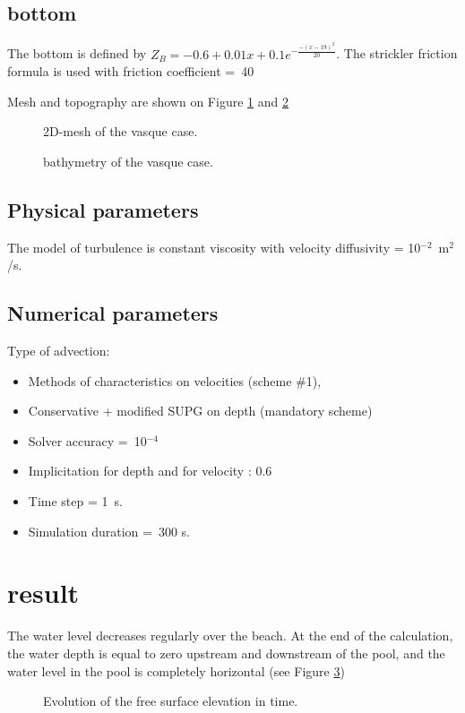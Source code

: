 \subsection{bottom}
The bottom is  defined by $Z_B=-0.6+0.01x+0.1e^{-\frac{-(x-19)^2}{20}}$.
The strickler friction formula is used with friction coefficient =~40

Mesh and topography are shown on Figure \ref{fig:vasque:Mesh} and \ref{fig:vasque:Bottom}

\begin{figure}[H]
 \centering
  \caption{2D-mesh of the vasque case.}\label{fig:vasque:Mesh}
\end{figure}
\begin{figure}[H]
 \centering
  \caption{bathymetry of the vasque case.}\label{fig:vasque:Bottom}
\end{figure}

\subsection{Physical parameters}

The model of turbulence is constant viscosity
with velocity diffusivity = 10$^{-2}$~m$^2$/s.

\subsection{Numerical parameters}
Type of advection:
\begin{itemize}
\item Methods of characteristics on velocities (scheme \#1),
\item Conservative + modified SUPG on depth (mandatory scheme)
\item Solver accuracy =~10$^{-4}$
\item Implicitation for depth and for velocity : 0.6
\item Time step = 1~s.
\item Simulation duration =~300 s.
\end{itemize}


\section{result}
The water level decreases regularly over the beach. At the end of the
calculation, the water depth is equal to
zero upstream and downstream of the pool, and the water level in the pool
is completely horizontal (see Figure \ref{fig:vasque:FreeSurface})
\begin{figure}[H]
 \centering
  \caption{Evolution of the free surface elevation in time.}\label{fig:vasque:FreeSurface}
\end{figure}
